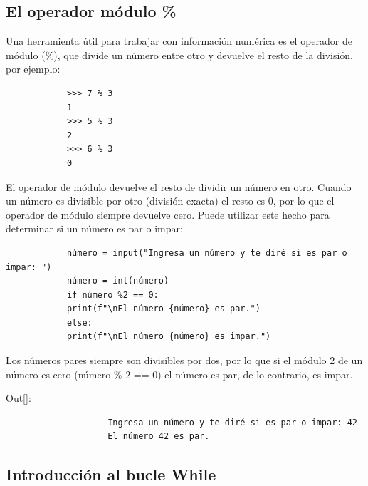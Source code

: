 {		
		
		
		
		
		\subsection{El operador módulo {{ }\ttfamily \%} }
		
		Una herramienta útil para trabajar con información numérica es el operador de módulo ({\ttfamily \%}), que divide un número entre otro y devuelve el resto de la división, por ejemplo:
		\begin{lstlisting}		
			>>> 7 % 3
			1
			>>> 5 % 3
			2
			>>> 6 % 3
			0
		\end{lstlisting}	
		
		
		El operador de módulo  devuelve el resto de dividir un número  en otro. Cuando un número es divisible por otro (división exacta) el resto es 0, por lo que el operador de módulo siempre devuelve cero. Puede utilizar este hecho para determinar si un número es par o impar:
		
		\hspace{-3.1cm}{\ttfamily \scriptsize par\_impar.py.py}\vspace{-0.5cm}
		\begin{lstlisting}
			número = input("Ingresa un número y te diré si es par o impar: ")
			número = int(número)
			if número %2 == 0:
			print(f"\nEl número {número} es par.")
			else:
			print(f"\nEl número {número} es impar.")
		\end{lstlisting} 
		
		Los números pares siempre son divisibles por dos, por lo que si el módulo 2 de un número
		es cero (número \% 2 == 0) el número es par,  de lo contrario, es impar.
		
		{\ttfamily\scriptsize\scriptsize \noindent Out[]:\vspace{-0.3cm}	
			{\color{blue} 	
				\begin{verbatim}
					Ingresa un número y te diré si es par o impar: 42
					El número 42 es par.			
				\end{verbatim}
		}}
		
		
		
		\subsection{Introducción al  bucle While}
		
}
